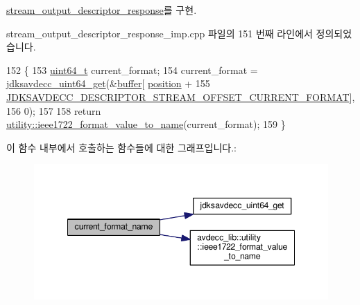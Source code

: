 \hyperlink{classavdecc__lib_1_1stream__output__descriptor__response_a24176b56bc0f1873b27d00565bc397c5}{stream\+\_\+output\+\_\+descriptor\+\_\+response}를 구현.



stream\+\_\+output\+\_\+descriptor\+\_\+response\+\_\+imp.\+cpp 파일의 151 번째 라인에서 정의되었습니다.


\begin{DoxyCode}
152 \{
153     \hyperlink{parse_8c_aec6fcb673ff035718c238c8c9d544c47}{uint64\_t} current\_format;
154     current\_format = \hyperlink{group__endian_gac8c2b48b7d7db101708e0197e366ac42}{jdksavdecc\_uint64\_get}(&\hyperlink{classavdecc__lib_1_1descriptor__response__base__imp_a56ed84df35de10bdb65e72b184309497}{buffer}[
      \hyperlink{classavdecc__lib_1_1descriptor__response__base__imp_a7a04afe5347934be732ec70a70bd0a28}{position} +
155                                                    
      \hyperlink{group__descriptor__stream_ga7a5a95301a026cee8fb77bf0f575e93f}{JDKSAVDECC\_DESCRIPTOR\_STREAM\_OFFSET\_CURRENT\_FORMAT}],
156                                            0);
157 
158     \textcolor{keywordflow}{return} \hyperlink{namespaceavdecc__lib_1_1utility_a65f055a50d3d236b67d30c1a7b8425c8}{utility::ieee1722\_format\_value\_to\_name}(current\_format);
159 \}
\end{DoxyCode}


이 함수 내부에서 호출하는 함수들에 대한 그래프입니다.\+:
\nopagebreak
\begin{figure}[H]
\begin{center}
\leavevmode
\includegraphics[width=348pt]{classavdecc__lib_1_1stream__output__descriptor__response__imp_a41ea895a8803b5e19ec9ebf1e6cc3a61_cgraph}
\end{center}
\end{figure}


